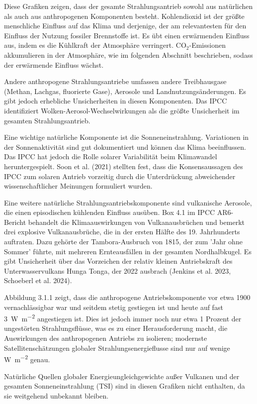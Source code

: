 \documentclass[12pt,paper=a4,DIV=12,parskip=never,chapterprefix=false,headings=standardclasses]{scrreprt}
\numberwithin{figure}{chapter}
\begin{document}
Diese Grafiken zeigen, dass der gesamte Strahlungsantrieb sowohl aus natürlichen als auch aus anthropogenen Komponenten besteht. Kohlendioxid ist der größte menschliche Einfluss auf das Klima und derjenige, der am relevantesten für den Einfluss der Nutzung fossiler Brennstoffe ist. Es übt einen erwärmenden Einfluss aus, indem es die Kühlkraft der Atmosphäre verringert. CO$_2$-Emissionen akkumulieren in der Atmosphäre, wie im folgenden Abschnitt beschrieben, sodass der erwärmende Einfluss wächst.

Andere anthropogene Strahlungsantriebe umfassen andere Treibhausgase (Methan, Lachgas, fluorierte Gase), Aerosole und Landnutzungsänderungen. Es gibt jedoch erhebliche Unsicherheiten in diesen Komponenten. Das IPCC identifiziert Wolken-Aerosol-Wechselwirkungen als die größte Unsicherheit im gesamten Strahlungsantrieb.

Eine wichtige natürliche Komponente ist die Sonneneinstrahlung. Variationen in der Sonnenaktivität sind gut dokumentiert und können das Klima beeinflussen. Das IPCC hat jedoch die Rolle solarer Variabilität beim Klimawandel heruntergespielt. Soon et al. (2021) stellten fest, dass die Konsensaussagen des IPCC zum solaren Antrieb vorzeitig durch die Unterdrückung abweichender wissenschaftlicher Meinungen formuliert wurden.

Eine weitere natürliche Strahlungsantriebskomponente sind vulkanische Aerosole, die einen episodischen kühlenden Einfluss ausüben. Box 4.1 im IPCC AR6-Bericht behandelt die Klimaauswirkungen von Vulkanausbrüchen und bemerkt drei explosive Vulkanausbrüche, die in der ersten Hälfte des 19. Jahrhunderts auftraten. Dazu gehörte der Tambora-Ausbruch von 1815, der zum 'Jahr ohne Sommer' führte, mit mehreren Ernteausfällen in der gesamten Nordhalbkugel. Es gibt Unsicherheit über das Vorzeichen der relativ kleinen Antriebskraft des Unterwasservulkans Hunga Tonga, der 2022 ausbrach (Jenkins et al. 2023, Schoeberl et al. 2024).

Abbildung 3.1.1 zeigt, dass die anthropogene Antriebskomponente vor etwa 1900 vernachlässigbar war und seitdem stetig gestiegen ist und heute auf fast \SI{3}{\watt\per\square\meter} angestiegen ist. Dies ist jedoch immer noch nur etwa 1 Prozent der ungestörten Strahlungsflüsse, was es zu einer Herausforderung macht, die Auswirkungen des anthropogenen Antriebs zu isolieren; modernste Satellitenschätzungen globaler Strahlungsenergieflusse sind nur auf wenige \si{\watt\per\square\meter} genau.

Natürliche Quellen globaler Energieungleichgewichte außer Vulkanen und der gesamten Sonneneinstrahlung (TSI) sind in diesen Grafiken nicht enthalten, da sie weitgehend unbekannt bleiben.
\end{document}
